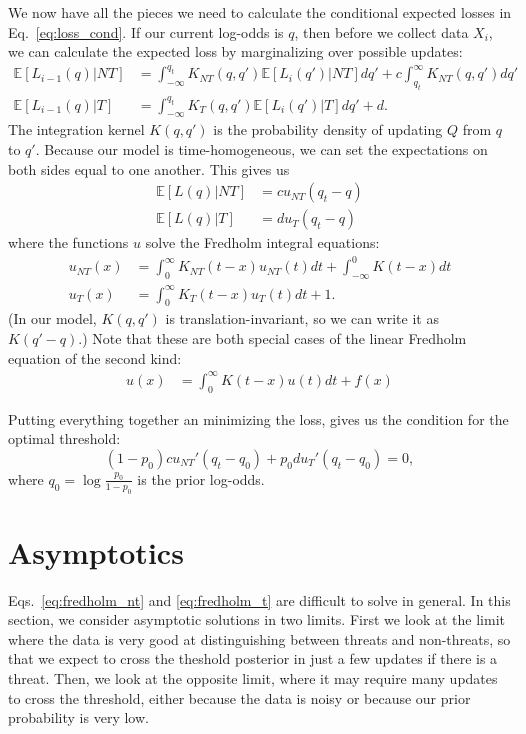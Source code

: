\documentclass[12pt, letterpaper]{article}
\begin{document}
We now have all the pieces we need to calculate the conditional expected losses in Eq.~\ref{eq:loss_cond}.
If our current log-odds is $q$, then before we collect data $X_i$, we can calculate the expected loss by marginalizing over possible updates:
\begin{align}
    \mathbb{E}[L_{i-1}(q) | NT] & = \int_{-\infty}^{q_t} K_{NT}(q, q') \mathbb{E}[L_{i}(q')| NT]  dq' + c \int_{q_t}^{\infty} K_{NT}(q, q') dq' \\
    \mathbb{E}[L_{i-1}(q) | T] & = \int_{-\infty}^{q_t} K_{T}(q, q') \mathbb{E}[L_{i}(q')| T]  dq' + d.
\end{align}
The integration kernel $K(q, q')$ is the probability density of updating $Q$ from $q$ to $q'$.
Because our model is time-homogeneous, we can set the expectations on both sides equal to one another.
This gives us
\begin{align}
    \mathbb{E}[L(q) | NT] & = c u_{NT}(q_t - q) \\
    \mathbb{E}[L(q) | T] & = d u_{T}(q_t - q)
\end{align}
where the functions $u$ solve the Fredholm integral equations:
\begin{align}
    u_{NT}(x) & = \int_{0}^{\infty} K_{NT}(t - x) u_{NT}(t) dt + \int_{-\infty}^{0} K(t - x) dt
    \label{eq:fredholm_nt} \\
    u_{T}(x) & = \int_{0}^{\infty} K_{T}(t - x) u_{T}(t) dt + 1.
    \label{eq:fredholm_t}
\end{align}
(In our model, $K(q, q')$ is translation-invariant, so we can write it as $K(q' - q)$.)
Note that these are both special cases of the linear Fredholm equation of the second kind:
\begin{align}
    u(x) &= \int_0^{\infty} K(t - x) u(t) dt + f(x)
\end{align}

Putting everything together an minimizing the loss, gives us the condition for the optimal threshold:
\begin{equation}
    (1 - p_0) c u_{NT}'(q_t - q_0) + p_0 d u_{T}'(q_t - q_0) = 0,
    \label{eq:optimum}
\end{equation}
where $q_0 = \log \frac{p_0}{1-p_0}$ is the prior log-odds.

\section{Asymptotics}

Eqs.~\ref{eq:fredholm_nt} and \ref{eq:fredholm_t} are difficult to solve in general.
In this section, we consider asymptotic solutions in two limits.
First we look at the limit where the data is very good at distinguishing between threats and non-threats, so that we expect to cross the theshold posterior in just a few updates if there is a threat.
Then, we look at the opposite limit, where it may require many updates to cross the threshold, either because the data is noisy or because our prior probability is very low.
\end{document}
